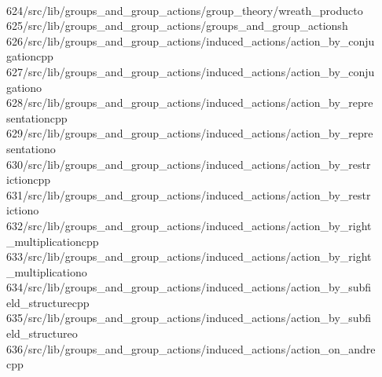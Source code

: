 \begin{tabbing}
\>\\[0pt]
624\>/src/lib/groups\_and\_group\_actions/group\_theory/wreath\_producto\\[0pt]
625\>/src/lib/groups\_and\_group\_actions/groups\_and\_group\_actionsh\\[0pt]
626\>/src/lib/groups\_and\_group\_actions/induced\_actions/action\_by\_conju\\[0pt]
\>gationcpp\\[0pt]
627\>/src/lib/groups\_and\_group\_actions/induced\_actions/action\_by\_conju\\[0pt]
\>gationo\\[0pt]
628\>/src/lib/groups\_and\_group\_actions/induced\_actions/action\_by\_repre\\[0pt]
\>sentationcpp\\[0pt]
629\>/src/lib/groups\_and\_group\_actions/induced\_actions/action\_by\_repre\\[0pt]
\>sentationo\\[0pt]
630\>/src/lib/groups\_and\_group\_actions/induced\_actions/action\_by\_restr\\[0pt]
\>ictioncpp\\[0pt]
631\>/src/lib/groups\_and\_group\_actions/induced\_actions/action\_by\_restr\\[0pt]
\>ictiono\\[0pt]
632\>/src/lib/groups\_and\_group\_actions/induced\_actions/action\_by\_right\\[0pt]
\>\_multiplicationcpp\\[0pt]
633\>/src/lib/groups\_and\_group\_actions/induced\_actions/action\_by\_right\\[0pt]
\>\_multiplicationo\\[0pt]
634\>/src/lib/groups\_and\_group\_actions/induced\_actions/action\_by\_subfi\\[0pt]
\>eld\_structurecpp\\[0pt]
635\>/src/lib/groups\_and\_group\_actions/induced\_actions/action\_by\_subfi\\[0pt]
\>eld\_structureo\\[0pt]
636\>/src/lib/groups\_and\_group\_actions/induced\_actions/action\_on\_andre\\[0pt]
\>cpp\\[0pt]

\end{tabbing}

